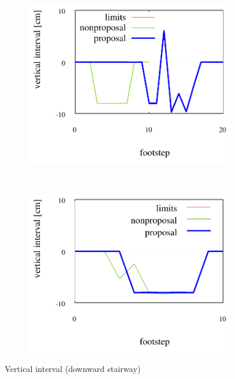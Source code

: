 \documentclass[autodetect-engine,dvipdfmx-if-dvi,ja=standard,a4j,jbase=11pt,magstyle=nomag*]{bxjsreport}
\begin{document}
\begin{figure}[pt]%
    \centering%
    \begin{subfigure}[c]{\linewidth}
        \centering%
        \includegraphics[width=0.75\linewidth, clip]{./figure/sim_hrp2_stair_downbad_zdiff.pdf}%
        \label{fig:sim_hrp2_stair_downbad_zdiff}%
    \end{subfigure}\\ %
    \vfil%
    \begin{subfigure}[c]{\linewidth}
        \centering%
        \includegraphics[width=0.75\linewidth, clip]{./figure/sim_hrp2_stair_down_zdiff.pdf}%
        \label{fig:sim_hrp2_stair_downgood_zdiff}%
    \end{subfigure}%
    \caption{Vertical interval (downward stairway)}%
    \label{fig:sim_hrp2_stair_down_zdiff}%
\end{figure}
\end{document}
